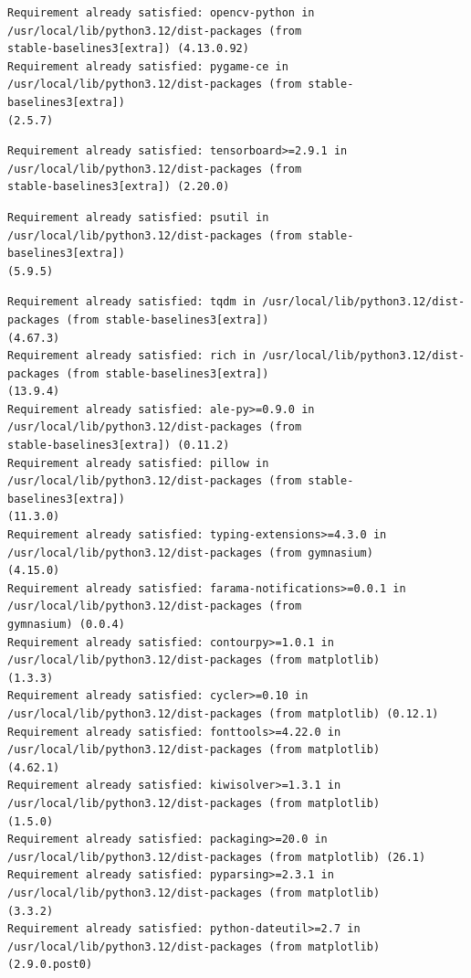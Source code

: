 \documentclass[11pt]{article}
\begin{document}
    
    
    \begin{Verbatim}[commandchars=\\\{\}]
Requirement already satisfied: opencv-python in /usr/local/lib/python3.12/dist-packages (from 
stable-baselines3[extra]) (4.13.0.92)
Requirement already satisfied: pygame-ce in /usr/local/lib/python3.12/dist-packages (from stable-baselines3[extra])
(2.5.7)

    \end{Verbatim}

    
    
    \begin{Verbatim}[commandchars=\\\{\}]
Requirement already satisfied: tensorboard>=2.9.1 in /usr/local/lib/python3.12/dist-packages (from 
stable-baselines3[extra]) (2.20.0)

    \end{Verbatim}

    
    
    \begin{Verbatim}[commandchars=\\\{\}]
Requirement already satisfied: psutil in /usr/local/lib/python3.12/dist-packages (from stable-baselines3[extra]) 
(5.9.5)

    \end{Verbatim}

    
    
    \begin{Verbatim}[commandchars=\\\{\}]
Requirement already satisfied: tqdm in /usr/local/lib/python3.12/dist-packages (from stable-baselines3[extra]) 
(4.67.3)
Requirement already satisfied: rich in /usr/local/lib/python3.12/dist-packages (from stable-baselines3[extra]) 
(13.9.4)
Requirement already satisfied: ale-py>=0.9.0 in /usr/local/lib/python3.12/dist-packages (from 
stable-baselines3[extra]) (0.11.2)
Requirement already satisfied: pillow in /usr/local/lib/python3.12/dist-packages (from stable-baselines3[extra]) 
(11.3.0)
Requirement already satisfied: typing-extensions>=4.3.0 in /usr/local/lib/python3.12/dist-packages (from gymnasium)
(4.15.0)
Requirement already satisfied: farama-notifications>=0.0.1 in /usr/local/lib/python3.12/dist-packages (from 
gymnasium) (0.0.4)
Requirement already satisfied: contourpy>=1.0.1 in /usr/local/lib/python3.12/dist-packages (from matplotlib) 
(1.3.3)
Requirement already satisfied: cycler>=0.10 in /usr/local/lib/python3.12/dist-packages (from matplotlib) (0.12.1)
Requirement already satisfied: fonttools>=4.22.0 in /usr/local/lib/python3.12/dist-packages (from matplotlib) 
(4.62.1)
Requirement already satisfied: kiwisolver>=1.3.1 in /usr/local/lib/python3.12/dist-packages (from matplotlib) 
(1.5.0)
Requirement already satisfied: packaging>=20.0 in /usr/local/lib/python3.12/dist-packages (from matplotlib) (26.1)
Requirement already satisfied: pyparsing>=2.3.1 in /usr/local/lib/python3.12/dist-packages (from matplotlib) 
(3.3.2)
Requirement already satisfied: python-dateutil>=2.7 in /usr/local/lib/python3.12/dist-packages (from matplotlib) 
(2.9.0.post0)

    \end{Verbatim}
\end{document}
